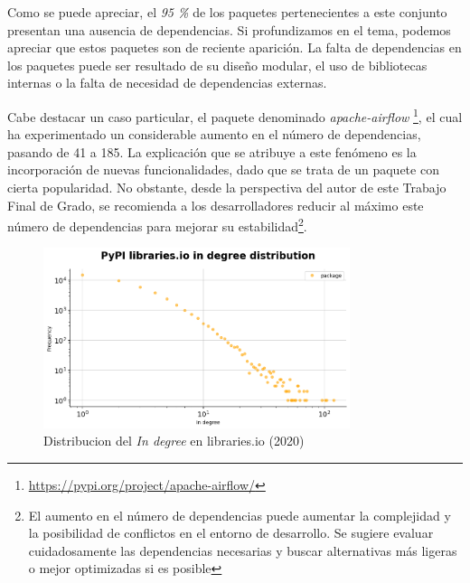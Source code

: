 Como se puede apreciar, el \textit{95 \%} de los paquetes pertenecientes a este conjunto presentan una ausencia
de dependencias.
Si profundizamos en el tema, podemos apreciar que estos paquetes son de reciente aparición. La falta de
dependencias en los paquetes puede ser resultado de su diseño modular, el uso de
bibliotecas internas o la falta de necesidad de dependencias externas.

Cabe destacar un caso particular, el paquete denominado \textit{apache-airflow}
\footnote{\url{https://pypi.org/project/apache-airflow/}}, el cual ha experimentado un considerable aumento
en el número de dependencias, pasando de 41 a 185. La explicación que se atribuye a este fenómeno es la
incorporación de nuevas funcionalidades, dado que se trata de un paquete con cierta popularidad. No obstante,
desde la perspectiva del autor de este Trabajo Final de Grado, se recomienda a los desarrolladores reducir
al máximo este número de dependencias para mejorar su estabilidad\footnote{El aumento en el número de dependencias
    puede aumentar la complejidad y la posibilidad de conflictos en el entorno de desarrollo. Se sugiere evaluar
    cuidadosamente las dependencias necesarias y buscar alternativas más ligeras o mejor optimizadas si es posible}.

\begin{figure}[h!]
    \begin{center}
        \includegraphics[width=0.8\textwidth]{img/pypi/ind_libio_d.png}
        \caption{Distribucion del \textit{In degree} en libraries.io (2020)}
        \label{fig: Distribucion del In degree en libraries.io}
    \end{center}
\end{figure}

